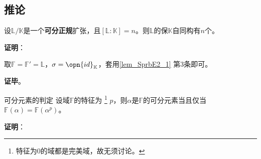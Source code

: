 \subsection{推论}















\begin{corollary}{}\label{cor_SprbE2_2}
设$\mathbb{L}/\mathbb{K}$是一个\textbf{可分正规}扩张，且$[\mathbb{L}:\mathbb{K}]=n$。则$\mathbb{L}$的保$\mathbb{K}$自同构有$n$个。
\end{corollary}

\textbf{证明}：

取$\mathbb{F}=\mathbb{F}'=\mathbb{L}$，$\sigma=\opn{id}_{\mathbb{K}}$，套用\autoref{lem_SprbE2_1} 第$3$条即可。

\textbf{证毕}。





\begin{lemma}{可分元素的判定}\label{lem_SprbE2_2}
设域$\mathbb{F}$的特征为
\footnote{特征为$0$的域都是完美域，故无须讨论。}
$p$，则$\alpha$是$\mathbb{F}$的可分元素当且仅当$\mathbb{F}(\alpha)=\mathbb{F}(\alpha^p)$。
\end{lemma}





\textbf{证明}：

